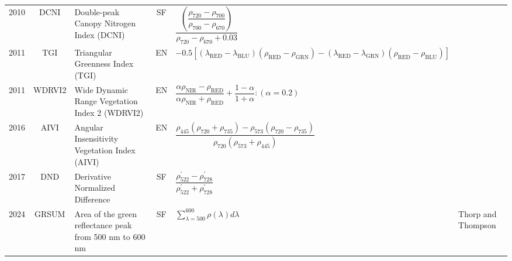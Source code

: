 \documentclass[10pt]{article}
\begin{document}
\begin{ThreePartTable}
\begin{longtable}{c c m{2.3in} c M{2.8in} M{1.5in}}
  2010 & DCNI    & Double-peak Canopy Nitrogen Index (DCNI)                                       & SF & $\dfrac{\left(\dfrac{\rho_{720}-\rho_{700}}{\rho_{700}-\rho_{670}}\right)}{\rho_{720}-\rho_{670}+0.03}$                                                                                                                                                                                 & \citet{Chen2010}                                    \\
  2011 & TGI     & Triangular Greenness Index (TGI)                                               & EN & $-0.5[(\lambda_\text{RED}-\lambda_\text{BLU})(\rho_\text{RED}-\rho_\text{GRN})-(\lambda_\text{RED}-\lambda_\text{GRN})(\rho_\text{RED}-\rho_\text{BLU})]$                                                                                                                               & \citet{Hunt2011}                                    \\
  2011 & WDRVI2  & Wide Dynamic Range Vegetation Index 2 (WDRVI2)                                 & EN & $\dfrac{\alpha\rho_\text{NIR}-\rho_\text{RED}}{\alpha\rho_\text{NIR}+\rho_\text{RED}}+\dfrac{1-\alpha}{1+\alpha} : (\alpha=0.2)$                                                                                                                                                        & \citet{Peng2011}                                    \\
  2016 & AIVI    & Angular Insensitivity Vegetation Index (AIVI)                                  & EN & $\dfrac{\rho_{445}(\rho_{720}+\rho_{735})-\rho_{573}(\rho_{720}-\rho_{735})}{\rho_{720}(\rho_{573}+\rho_{445})}$                                                                                                                                                                        & \citet{He2016}                                      \\
  2017 & DND     & Derivative Normalized Difference                                               & SF & $\dfrac{\rho^\prime_{522}-\rho^\prime_{728}}{\rho^\prime_{522}+\rho^\prime_{728}}$                                                                                                                                                                                                      & \citet{Sonobe2017}                                  \\
  2024 & GRSUM   & Area of the green reflectance peak from 500 nm to 600 nm                       & SF & $\sum\limits_{\lambda=500}^{600}\rho(\lambda)d\lambda$                                                                                                                                                                                                                                  & Thorp and Thompson                                  \\
\end{longtable}
\end{ThreePartTable}
\endgroup
\end{document}
